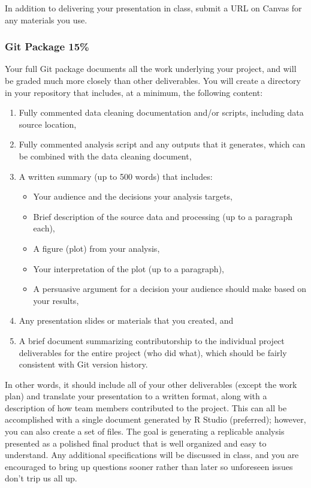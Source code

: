 \documentclass[11pt]{article}
\begin{document}
In addition to delivering your presentation in class, submit a URL on Canvas for any materials you use.

\subsubsection{Git Package  15\%}

Your full Git package documents all the work underlying your project, and will be graded much more closely than other deliverables.
You will create a directory in your repository that includes, at a minimum, the following content:

\begin{enumerate}
\item Fully commented data cleaning documentation and/or scripts, including data source location,
\item Fully commented analysis script and any outputs that it generates, which can be combined with the data cleaning document,
\item A written summary (up to 500 words) that includes:
\begin{itemize}
\item Your audience and the decisions your analysis targets,
\item Brief description of the source data and processing (up to a paragraph each),
\item A figure (plot) from your analysis,
\item Your interpretation of the plot (up to a paragraph),
\item A persuasive argument for a decision your audience should make based on your results,
\end{itemize}
\item Any presentation slides or materials that you created, and
\item A brief document summarizing contributorship to the individual project deliverables for the entire project (who did what), which should be fairly consistent with Git version history.
\end{enumerate}

In other words, it should include all of your other deliverables (except the work plan) and translate your presentation to a written format, along with a description of how team members contributed to the project.
This can all be accomplished with a single document generated by R Studio (preferred); however, you can also create a set of files.
The goal is generating a replicable analysis presented as a polished final product that is well organized and easy to understand.
Any additional specifications will be discussed in class, and you are encouraged to bring up questions sooner rather than later so unforeseen issues don't trip us all up.
\end{document}
